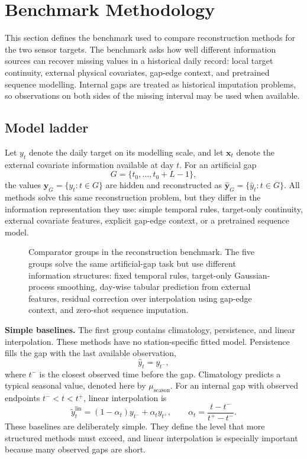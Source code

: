 \section{Benchmark Methodology}
\label{sec:methodology}

This section defines the benchmark used to compare reconstruction methods for the two sensor
targets. The benchmark asks how well different information sources can recover missing values in
a historical daily record: local target continuity, external physical covariates, gap-edge
context, and pretrained sequence modelling. Internal gaps are treated as historical imputation
problems, so observations on both sides of the missing interval may be used when available.

\subsection{Model ladder}
\label{sec:model_ladder}

Let $y_t$ denote the daily target on its modelling scale, and let
$\mathbf{x}_t$ denote the external covariate information available at day $t$. For an artificial
gap
\[
    G=\{t_0,\ldots,t_0+L-1\},
\]
the values $\mathbf y_G=\{y_t:t\in G\}$ are hidden and reconstructed as
$\hat{\mathbf y}_G=\{\hat y_t:t\in G\}$. All methods solve this same reconstruction problem, but
they differ in the information representation they use: simple temporal rules, target-only
continuity, external covariate features, explicit gap-edge context, or a pretrained sequence
model.

\begin{figure}[htbp]
  \centering
  \makebox[\textwidth][c]{%
    \hspace*{-1.5cm}%
    \resizebox{1.01\textwidth}{!}{}%
  }
  \caption{Comparator groups in the reconstruction benchmark.
  The five groups solve the same artificial-gap task but use different information structures:
  fixed temporal rules, target-only Gaussian-process smoothing, day-wise tabular prediction from
  external features, residual correction over interpolation using gap-edge context, and zero-shot sequence imputation.}
  \label{fig:model_ladder}
\end{figure}

\textbf{Simple baselines.}
The first group contains climatology, persistence, and linear interpolation. These methods have
no station-specific fitted model. Persistence fills the gap with the last available observation,
\[
    \hat y_t = y_{t^-},
\]
where $t^-$ is the closest observed time before the gap. Climatology predicts a typical seasonal
value, denoted here by $\mu_{\mathrm{season}}$. For an internal gap with observed endpoints
$t^-<t<t^+$, linear interpolation is
\[
    \tilde y_t^{\mathrm{lin}}
    =
    (1-\alpha_t)y_{t^-}+\alpha_t y_{t^+},
    \qquad
    \alpha_t=\frac{t-t^-}{t^+-t^-}.
\]
These baselines are deliberately simple. They define the level that more structured methods must
exceed, and linear interpolation is especially important because many observed gaps are short.
\vspace{0.25cm}

